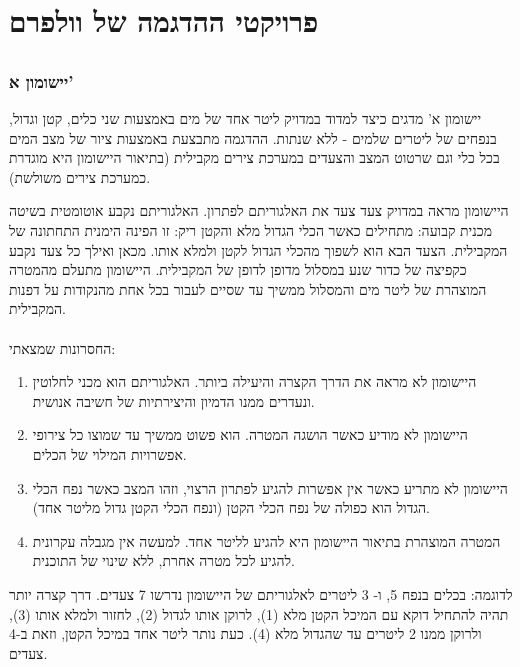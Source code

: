 
\section{פרויקטי ההדגמה של וולפרם}

\subsection*{}

\subsubsection*{יישומון א'}
יישומון א' מדגים כיצד למדוד במדויק ליטר אחד של מים באמצעות שני כלים, קטן וגדול, בנפחים של ליטרים %
שלמים - ללא שנתות. ההדגמה מתבצעת באמצעות ציור של מצב המים בכל כלי וגם שרטוט המצב והצעדים %
במערכת צירים מקבילית (בתיאור היישומון היא מוגדרת כמערכת צירים משולשת).%

היישומון מראה במדויק צעד צעד את האלגוריתם לפתרון. האלגוריתם נקבע אוטומטית בשיטה מכנית קבועה: %
מתחילים כאשר הכלי הגדול מלא והקטן ריק: זו הפינה הימנית התחתונה של המקבילית. הצעד הבא הוא %
לשפוך מהכלי הגדול לקטן ולמלא אותו. מכאן ואילך כל צעד נקבע כקפיצה של כדור שנע במסלול מדופן %
לדופן של המקבילית. היישומון מתעלם מהמטרה המוצהרת של ליטר מים והמסלול ממשיך עד שסיים %
לעבור בכל אחת מהנקודות על דפנות המקבילית.
\\
\hspace*{469pt}
\\
החסרונות שמצאתי:
\begin{enumerate}[=dsfasd, itemsep=-2pt, itemindent=2em] %
\item \parbox[t][2.2em][t]{420pt}{היישומון לא מראה את הדרך הקצרה והיעילה ביותר. האלגוריתם הוא מכני לחלוטין ונעדרים ממנו  הדמיון והיצירתיות של חשיבה אנושית.}
\item היישומון לא מודיע כאשר הושגה המטרה. הוא פשוט ממשיך עד שמוצו כל צירופי אפשרויות המילוי של הכלים.
\item \parbox[t][2.2em][t]{420pt}{היישומון לא מתריע כאשר אין אפשרות להגיע לפתרון הרצוי, וזהו המצב כאשר נפח הכלי הגדול הוא כפולה של נפח הכלי הקטן (ונפח הכלי הקטן גדול מליטר אחד).}
\item \parbox[t][2.2em][t]{420pt}{המטרה המוצהרת בתיאור היישומון היא להגיע לליטר אחד. למעשה אין מגבלה עקרונית להגיע לכל מטרה אחרת, ללא שינוי של התוכנית.}
\end{enumerate}

לדוגמה: בכלים בנפח 5, ו- 3 ליטרים לאלגוריתם של היישומון נדרשו 7 צעדים. דרך קצרה יותר תהיה להתחיל %
דוקא עם המיכל הקטן מלא (1), לרוקן אותו לגדול (2), לחזור ולמלא אותו (3), ולרוקן ממנו 2 ליטרים עד שהגדול %
מלא (4). כעת נותר ליטר אחד במיכל הקטן, וזאת ב-4 צעדים.

